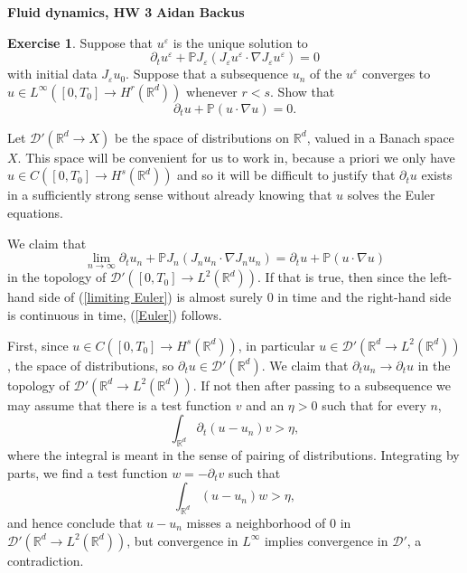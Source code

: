 \documentclass[10pt]{article}
\newcommand{\RR}{\mathbb{R}}
\newcommand{\PP}{\mathbb P}
\theoremstyle{definition}
\newtheorem{exer}{Exercise}
\begin{document}
\noindent
\large\textbf{Fluid dynamics, HW 3} \hfill \textbf{Aidan Backus} \\

\begin{exer}
Suppose that $u^\varepsilon$ is the unique solution to
$$\partial_t u^\varepsilon + \PP J_\varepsilon(J_\varepsilon u^\varepsilon \cdot \nabla J_\varepsilon u^\varepsilon) = 0$$
with initial data $J_\varepsilon u_0$.
Suppose that a subsequence $u_n$ of the $u^\varepsilon$ converges to $u \in L^\infty([0, T_0] \to H^r(\RR^d))$ whenever $r < s$.
Show that
\begin{equation}
\label{Euler}
\partial_t u + \PP(u \cdot \nabla u) = 0.
\end{equation}
\end{exer}

Let $\mathcal D'(\RR^d \to X)$ be the space of distributions on $\RR^d$, valued in a Banach space $X$.
This space will be convenient for us to work in, because a priori we only have $u \in C([0, T_0] \to H^s(\RR^d))$ and so it will be difficult to justify that $\partial_t u$ exists in a sufficiently strong sense without already knowing that $u$ solves the Euler equations.

We claim that
\begin{equation}
\label{limiting Euler}
\lim_{n \to \infty} \partial_t u_n + \PP J_n(J_n u_n \cdot \nabla J_n u_n) = \partial_t u + \PP(u \cdot \nabla u)
\end{equation}
in the topology of $\mathcal D'([0, T_0] \to L^2(\RR^d))$.
If that is true, then since the left-hand side of (\ref{limiting Euler}) is almost surely $0$ in time and the right-hand side is continuous in time, (\ref{Euler}) follows.

First, since $u \in C([0, T_0] \to H^s(\RR^d))$, in particular $u \in \mathcal D'(\RR^d \to L^2(\RR^d))$, the space of distributions, so $\partial_t u \in \mathcal D'(\RR^d)$.
We claim that $\partial_t u_n \to \partial_t u$ in the topology of $\mathcal D'(\RR^d \to L^2(\RR^d))$.
If not then after passing to a subsequence we may assume that there is a test function $v$ and an $\eta > 0$ such that for every $n$,
$$\int_{\RR^d} \partial_t (u - u_n)v > \eta,$$
where the integral is meant in the sense of pairing of distributions. Integrating by parts, we find a test function $w = -\partial_tv$ such that
$$\int_{\RR^d} (u - u_n)w > \eta,$$
and hence conclude that $u - u_n$ misses a neighborhood of $0$ in $\mathcal D'(\RR^d \to L^2(\RR^d))$, but convergence in $L^\infty$ implies convergence in $\mathcal D'$, a contradiction.
\end{document}
